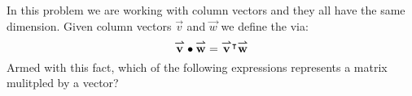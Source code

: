 \documentclass{ximera}
\author{Bart Snapp}
\begin{document}
\begin{exercise}
  In this problem we are working with column vectors and they all have
  the same dimension. Given column vectors $\vec{v}$ and $\vec{w}$ we
  define the  via:
  \[
  {\overset{\boldsymbol{\rightharpoonup}}{\mathbf{v}}}\hspace{0in}\bullet {\overset{\boldsymbol{\rightharpoonup}}{\mathbf{w}}}\hspace{0in} = {\overset{\boldsymbol{\rightharpoonup}}{\mathbf{v}}}\hspace{0in}^\intercal {\overset{\boldsymbol{\rightharpoonup}}{\mathbf{w}}}\hspace{0in}
  \]
  Armed with this fact, which of the following expressions represents
  a matrix mulitpled by a vector?
  \begin{multipleChoice}
  \end{multipleChoice}
\end{exercise}
\end{document}
